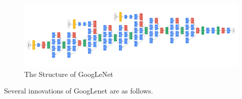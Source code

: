 \documentclass[a4paper]{article}
\begin{document}
\begin{table}[ht]
{}

    \label{tab:your_label}
\end{table}
\begin{figure}[ht]
    \centering
    \includegraphics[width=\textwidth]{images/GooGLenet.png}
    \caption{The Structure of GoogLeNet\citep{DBLP:journals/corr/SzegedyLJSRAEVR14}}
\end{figure}


Several innovations of GoogLenet are as follows.
\end{document}

